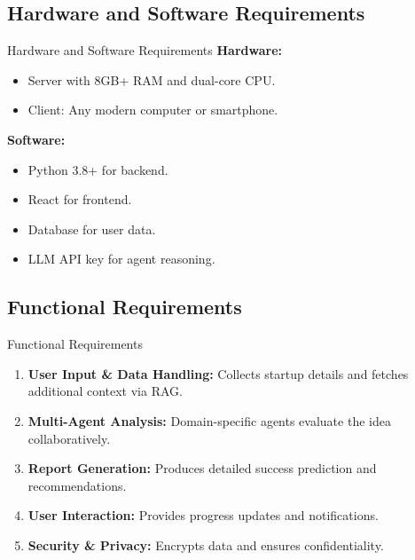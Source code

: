 \documentclass{beamer}
\begin{document}
\subsection{Hardware and Software Requirements}
\begin{frame}{Hardware and Software Requirements}
    \textbf{Hardware:}
    \begin{itemize}
        \item Server with 8GB+ RAM and dual-core CPU.
        \item Client: Any modern computer or smartphone.
    \end{itemize}
    \vspace{6pt}
    \textbf{Software:}
    \begin{itemize}
        \item Python 3.8+ for backend.
        \item React for frontend.
        \item Database for user data.
        \item LLM API key for agent reasoning.
    \end{itemize}
\end{frame}

\subsection{Functional Requirements}
\begin{frame}{Functional Requirements}
    \begin{enumerate}
        \item \textbf{User Input \& Data Handling:} Collects startup details and fetches additional context via RAG.
        \item \textbf{Multi-Agent Analysis:} Domain-specific agents evaluate the idea collaboratively.
        \item \textbf{Report Generation:} Produces detailed success prediction and recommendations.
        \item \textbf{User Interaction:} Provides progress updates and notifications.
        \item \textbf{Security \& Privacy:} Encrypts data and ensures confidentiality.
    \end{enumerate}
\end{frame}
\end{document}
